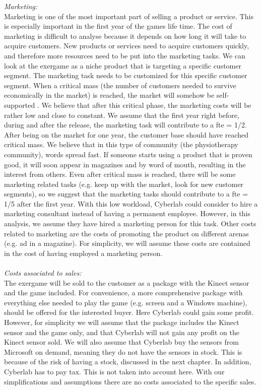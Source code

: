 \emph{Marketing:}\\
Marketing is one of the most important part of selling a product or service. This is especially important in the first year of the games life time. The cost of marketing is difficult to analyse because it depends on how long it will take to acquire customers. New products or services need to acquire customers quickly, and therefore more resources need to be put into the marketing tasks. We can look at the exergame as a niche product that is targeting a specific customer segment. The marketing task needs to be customized for this specific customer segment. When a critical mass (the number of customers needed to survive economically in the market) is reached, the market will somehow be self-supported \cite{informationrules}. We believe that after this critical phase, the marketing costs will be rather low and close to constant. We assume that the first year right before, during and after the release, the marketing task will contribute to a \ac{fte} = 1/2. After being on the market for one year, the customer base should have reached critical mass.  We believe that in this type of community (the physiotherapy community), words spread fast. If someone starts using a product that is proven good, it will soon appear in magazines and by word of mouth, resulting in the interest from others. Even after critical mass is reached, there will be some marketing related tasks (e.g. keep up with the market, look for new customer segments), so we suggest that the marketing tasks should contribute to a \ac{fte} = 1/5 after the first year. With this low workload, Cyberlab could consider to hire a marketing consultant instead of having a permanent employee. However, in this analysis, we assume they have hired a marketing person for this task. Other costs related to marketing are the costs of promoting the product on different arenas (e.g. ad in a magazine). For simplicity, we will assume these costs are contained in the cost of having employed a marketing person. \\ \\
\emph{Costs associated to sales:}\\
The exergame will be sold to the customer as a package with the Kinect sensor and the game included. For convenience, a more comprehensive package with everything else needed to play the game (e.g. screen and a Windows machine), should be offered for the interested buyer. Here Cyberlab could gain some profit. However, for simplicity we will assume that the package includes the Kinect sensor and the game only, and that Cyberlab will not gain any profit on the Kinect sensor sold. We will also assume that Cyberlab buy the sensors from Microsoft on demand, meaning they do not have the sensors in stock. This is because of the risk of having a stock, discussed in the next chapter. In addition, Cyberlab has to pay tax. This is not taken into account here. With our simplifications and assumptions there are no costs associated to the specific sales. \\ \\
